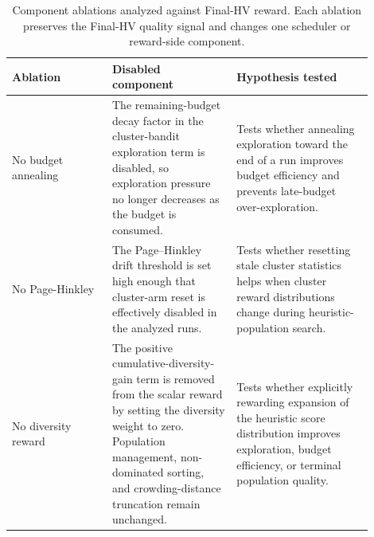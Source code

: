 \begin{table}[H]
\centering
\caption[Component ablation settings]{Component ablations analyzed against Final-HV reward. Each ablation preserves the Final-HV quality signal and changes one scheduler or reward-side component.}
\label{tab:ablation-settings}
\small
\renewcommand{\arraystretch}{1.12}
\setlength{\tabcolsep}{5pt}
\begin{tabular}{>{\raggedright\arraybackslash}p{0.25\linewidth}>{\raggedright\arraybackslash}p{0.31\linewidth}>{\raggedright\arraybackslash}p{0.34\linewidth}}
\toprule
Ablation & Disabled component & Hypothesis tested \\
\midrule
No budget annealing & The remaining-budget decay factor in the cluster-bandit exploration term is disabled, so exploration pressure no longer decreases as the budget is consumed. & Tests whether annealing exploration toward the end of a run improves budget efficiency and prevents late-budget over-exploration. \\
No Page-Hinkley & The Page--Hinkley drift threshold is set high enough that cluster-arm reset is effectively disabled in the analyzed runs. & Tests whether resetting stale cluster statistics helps when cluster reward distributions change during heuristic-population search. \\
No diversity reward & The positive cumulative-diversity-gain term is removed from the scalar reward by setting the diversity weight to zero. Population management, non-dominated sorting, and crowding-distance truncation remain unchanged. & Tests whether explicitly rewarding expansion of the heuristic score distribution improves exploration, budget efficiency, or terminal population quality. \\
\bottomrule
\end{tabular}
\end{table}
